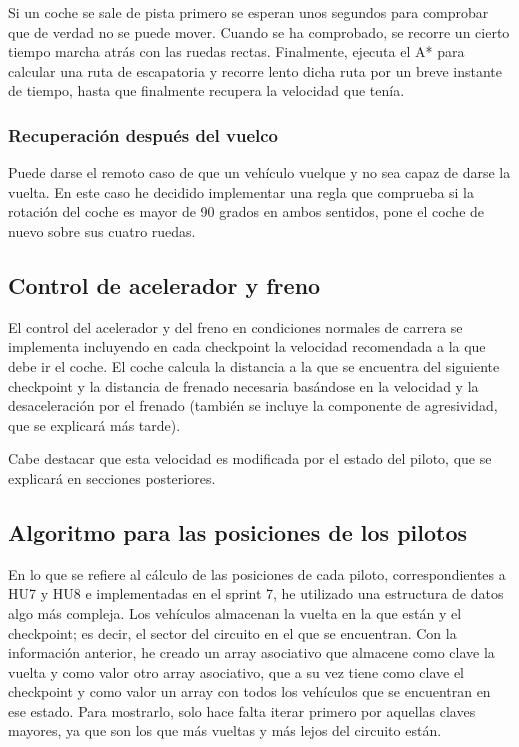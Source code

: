 Si un coche se sale de pista primero se esperan unos segundos para comprobar que de verdad no se puede mover. Cuando se ha comprobado, se recorre un cierto tiempo marcha atrás con las ruedas rectas. Finalmente, ejecuta el A* para calcular una ruta de escapatoria y recorre lento dicha ruta por un breve instante de tiempo, hasta que finalmente recupera la velocidad que tenía.

\subsubsection{Recuperación después del vuelco}

Puede darse el remoto caso de que un vehículo vuelque y no sea capaz de darse la vuelta. En este caso he decidido implementar una regla que comprueba si la rotación del coche es mayor de 90 grados en ambos sentidos, pone el coche de nuevo sobre sus cuatro ruedas.

\subsection{Control de acelerador y freno}

El control del acelerador y del freno en condiciones normales de carrera se implementa incluyendo en cada checkpoint la velocidad recomendada a la que debe ir el coche. El coche calcula la distancia a la que se encuentra del siguiente checkpoint y la distancia de frenado necesaria basándose en la velocidad y la desaceleración por el frenado (también se incluye la componente de agresividad, que se explicará más tarde).

\bigskip

Cabe destacar que esta velocidad es modificada por el estado del piloto, que se explicará en secciones posteriores.

\subsection{Algoritmo para las posiciones de los pilotos}

En lo que se refiere al cálculo de las posiciones de cada piloto, correspondientes a HU7 y HU8 e implementadas en el sprint 7, he utilizado una estructura de datos algo más compleja. Los vehículos almacenan la vuelta en la que están y el checkpoint; es decir, el sector del circuito en el que se encuentran. Con la información anterior, he creado un array asociativo que almacene como clave la vuelta y como valor otro array asociativo, que a su vez tiene como clave el checkpoint y como valor un array con todos los vehículos que se encuentran en ese estado. Para mostrarlo, solo hace falta iterar primero por aquellas claves mayores, ya que son los que más vueltas y más lejos del circuito están.

